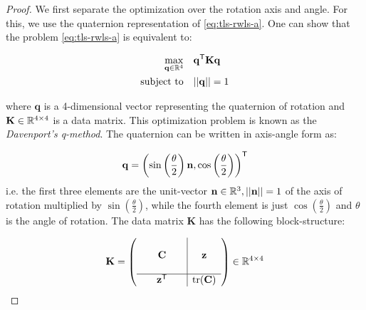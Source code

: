 \begin{proof}
	
	We first separate the optimization over the rotation axis and angle. For this, we use the quaternion representation of \ref{eq:tls-rwls-a}. One can show that the problem \ref{eq:tls-rwls-a} is equivalent to:
	
	\begin{equation}
		\label{eq:davenports-q-problem}
		\begin{aligned}
			\max_{\mathbf{q} \in \mathbb{R}^4} &\quad \mathbf{q}^{\mathsf{T}} \mathbf{K} \mathbf{q}\\
			\text{subject to} &\quad  ||\mathbf{q}|| = 1
		\end{aligned}
	\end{equation}
	
	where $\mathbf{q}$ is a 4-dimensional vector representing the quaternion of rotation and $\mathbf{K} \in \mathbb{R}^{4\times4}$ is a data matrix. This optimization problem is known as the \textit{Davenport's q-method}. The quaternion can be written in axis-angle form as:
	
	\begin{equation}
		\label{eq:q-axis-angle}
		\begin{aligned}
			\mathbf{q} = \left( \sin \left( \frac{\theta}{2} \right) \mathbf{n}, \cos \left(\frac{\theta}{2} \right) \right)^{\mathsf{T}}
		\end{aligned}
	\end{equation}
	i.e. the first three elements are the unit-vector $\mathbf{n} \in \mathbb{R}^3, ||\mathbf{n}|| = 1$ of the axis of rotation multiplied by $\sin \left( \frac{\theta}{2} \right)$, while the fourth element is just $\cos \left(\frac{\theta}{2} \right)$ and $\theta$ is the angle of rotation.
	The data matrix $\mathbf{K}$ has the following block-structure:
	
	\begin{equation}
		\label{eq:k-mat}
		\begin{aligned}
			\mathbf{K} = \left(
			\begin{array}{c|c}
				\begin{array}{ccc}
					& & \\
					& \mathbf{C} & \\
					& & 
				\end{array}
				&
				\begin{array}{c}
					\mathbf{z} \\
				\end{array}
				\\
				\hline
				\begin{array}{ccc}
					& \mathbf{z}^{\mathsf{T}} &
				\end{array}
				&
				\textrm{tr}(\mathbf{C})
			\end{array}
			\right) \in \mathbb{R}^{4 \times 4}
		\end{aligned}
	\end{equation}
	


\end{proof}
